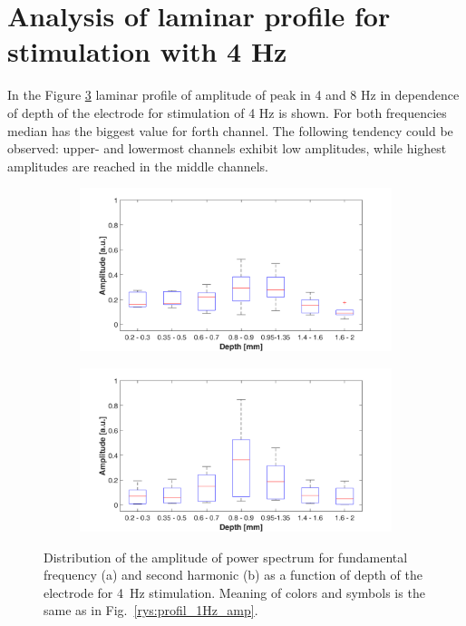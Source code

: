 \documentclass{pracalicmgr}
\begin{document}
  
\section{Analysis of laminar profile for stimulation with 4 Hz} 

 In the Figure \ref{rys:profil_4Hz_wid} laminar profile of amplitude of peak in 4 and 8 Hz in dependence of depth of the electrode for stimulation of 4 Hz is shown. For both frequencies median has the biggest value for forth channel. The following tendency could be observed: upper- and lowermost channels exhibit low amplitudes, while highest amplitudes are reached in the middle channels. 

   	\begin{figure}[H]
	\begin{subfigure}{.5\textwidth}
		\centering
		\includegraphics[width=1.\linewidth]{profile_4Hz_wid.png}
		\caption{}
		\label{rys:profil_4Hz_wid1}
	\end{subfigure}%
	\begin{subfigure}{.5\textwidth}
		\centering
		\includegraphics[width=1.\linewidth]{profile_4Hz_wid2.png}
		\caption{}
		\label{rys:profil_4Hz_wid2}
	\end{subfigure}
	\caption{Distribution of the amplitude of power spectrum for fundamental frequency (a) and second harmonic (b) as a function of depth of the electrode for 4~Hz stimulation. Meaning of colors and symbols is the same as in Fig.~\ref{rys:profil_1Hz_amp}.}
	\label{rys:profil_4Hz_wid}
\end{figure}
\end{document}
